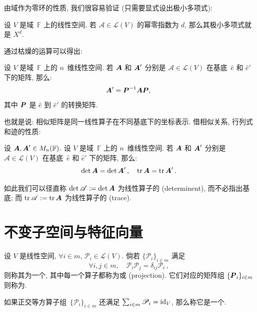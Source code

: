 \documentclass[openany, a5paper, oneside]{ctexbook}
\DeclareMathOperator{\tr}{tr}
\begin{document}
由域作为零环的性质, 我们很容易验证 (只需要显式设出极小多项式):

\begin{theorem}[幂零算子的极小多项式]
	设 $V$ 是域~$\mathbb F$ 上的线性空间. 若 $\mathscr A \in \mathcal L(V)$ 的幂零指数为 $d$, 那么其极小多项式就是 $X^d$.
\end{theorem}


通过枯燥的运算可以得出:
\begin{theorem}[线性算子在不同基底下的矩阵]
	设 $V$ 是域~$\mathbb F$ 上的 $n$~维线性空间. 若 $\boldsymbol{A}$ 和 $\boldsymbol{A}'$ 分别是 $\mathscr A \in \mathcal L(V)$ 在基底~$\hat e$ 和 $\hat e'$ 下的矩阵, 那么:
	\begin{equation*}
		\boldsymbol{A}' = \boldsymbol{P}^{-1} \boldsymbol{A} \boldsymbol{P},\,
	\end{equation*}
	其中 $\boldsymbol{P}$ 是 $\hat e$ 到 $\hat e'$ 的转换矩阵.
\end{theorem}

也就是说: 相似矩阵是同一线性算子在不同基底下的坐标表示.
借相似关系, 行列式和迹的性质:

\begin{theorem}[不变量]
	设 $\boldsymbol{A}, \boldsymbol{A}' \in M_n(\mathbb F)$. 
	设 $V$ 是域~$\mathbb F$ 上的 $n$~维线性空间. 若 $\boldsymbol{A}$ 和 $\boldsymbol{A}'$ 分别是 $\mathscr A \in \mathcal L(V)$ 在基底~$\hat e$ 和 $\hat e'$ 下的矩阵, 那么:
	\begin{equation*}
		\det \bv A = \det \bv A'\,, \quad
		\tr \bv A = \tr \bv A'\,.
	\end{equation*}
\end{theorem}

如此我们可以径直称 $\det \mathscr A := \det \boldsymbol{A}$ 为线性算子的 (determinent), 而不必指出基底;
而 $\tr \mathscr A := \tr \bv A$ 为线性算子的 (trace).

\section{不变子空间与特征向量}

\begin{definition}[正交等方算子组]
	设 $V$ 是线性空间, $\forall i \in m$, $\mathscr P_i \in \mathcal L(V)$. 
	倘若 $\{\mathscr P_i\}_{i \in m}$ 满足
	\begin{equation*}
		\forall i,j \in m, \quad
			\mathscr P_i \mathscr P_j = \delta_{ij} \mathscr P_i\,,
	\end{equation*}
	则称其为一个, 其中每一个算子都称为或 (projection).
	它们对应的矩阵组 $\{\boldsymbol{P}_i\}_{i \in m}$ 则称为. 
	
	如果正交等方算子组~$\{\mathscr P_i\}_{i \in m}$ 还满足 $\sum_{i \in m} \mathscr P_i = \operatorname{id}_V$, 那么称它是一个.
\end{definition}
\end{document}
